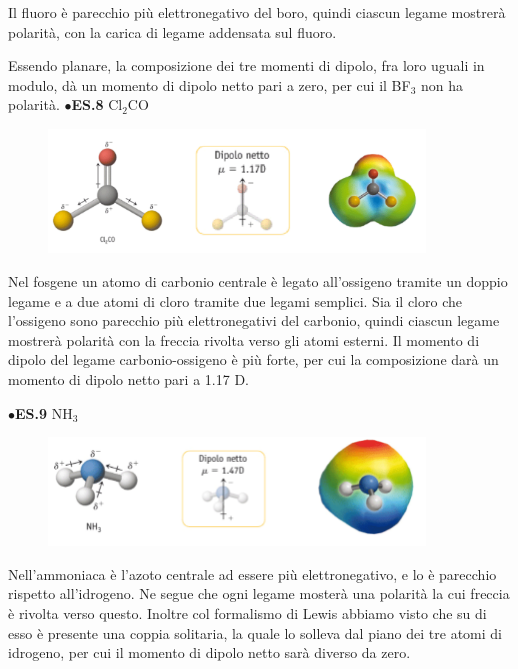 Il fluoro è parecchio più elettronegativo del boro, quindi ciascun legame mostrerà polarità, con la carica di legame addensata sul fluoro.

Essendo planare, la composizione dei tre momenti di dipolo, fra loro uguali in modulo, dà un momento di dipolo netto pari a zero, per cui il BF$_3$ non ha polarità. 
\newpage
\vspace{0.2cm}$\bullet$\textbf{ES.8} Cl$_2$CO

\begin{figure}[htp]
    \centering
    \includegraphics[width=10cm]{immagini/Cl_2CO.png}
\end{figure}

Nel fosgene un atomo di carbonio centrale è legato all'ossigeno tramite un doppio legame e a due atomi di cloro tramite due legami semplici. Sia il cloro che l'ossigeno sono parecchio più elettronegativi del carbonio, quindi ciascun legame mostrerà polarità con la freccia rivolta verso gli atomi esterni. Il momento di dipolo del legame carbonio-ossigeno è più forte, per cui la composizione darà un momento di dipolo netto pari a 1.17 D.

\vspace{0.2cm}$\bullet$\textbf{ES.9} NH$_3$

\begin{figure}[htp]
    \centering
    \includegraphics[width=10cm]{immagini/NH_3.png}
\end{figure}

Nell'ammoniaca è l'azoto centrale ad essere più elettronegativo, e lo è parecchio rispetto all'idrogeno. Ne segue che ogni legame mosterà una polarità la cui freccia è rivolta verso questo. Inoltre col formalismo di Lewis abbiamo visto che su di esso è presente una coppia solitaria, la quale lo solleva dal piano dei tre atomi di idrogeno, per cui il momento di dipolo netto sarà diverso da zero.

